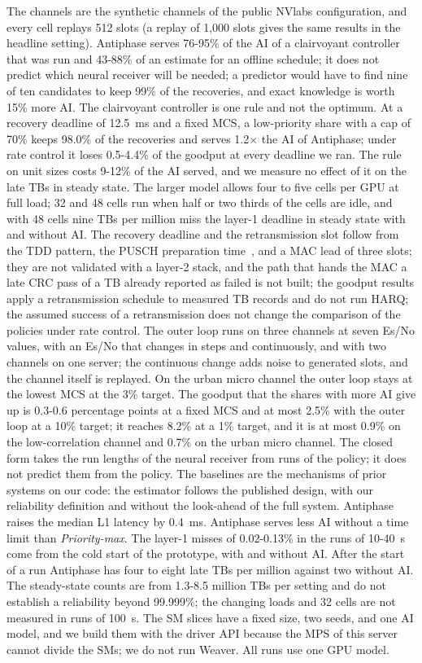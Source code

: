 \documentclass[acmsmall,screen,review,anonymous]{acmart}
\newcommand{\sys}{Antiphase\xspace}
\begin{document}
The channels are the synthetic channels of the public NVlabs configuration, and every cell replays 512
slots (a replay of 1,000 slots gives the same results in the headline setting). \sys serves 76-95\% of the AI of a
clairvoyant controller that was run and 43-88\% of an estimate for an offline schedule; it does not predict
which neural receiver will be needed; a predictor would have to find nine of ten candidates to keep 99\%
of the recoveries, and exact knowledge is worth 15\% more AI. The clairvoyant controller is one rule and not the optimum. At a recovery
deadline of 12.5~ms and a fixed MCS, a low-priority share with a cap of 70\% keeps 98.0\% of the recoveries and serves
1.2$\times$ the AI of \sys; under rate control it loses 0.5-4.4\% of the goodput at every deadline we ran. The
rule on unit sizes costs 9-12\% of the AI served, and we measure no effect of it on the late TBs in steady state. The larger model allows four to five cells per GPU at full load; 32 and 48 cells run when half or
two thirds of the cells are idle, and with 48 cells nine TBs per million miss the layer-1 deadline in steady
state with and without AI. The recovery deadline and the retransmission slot follow from the TDD pattern, the PUSCH preparation
time~\cite{ts38214}, and a MAC lead of three slots; they are not validated with a layer-2 stack, and the path
that hands the MAC a late CRC pass of a TB already reported as failed is not built; the goodput results apply a retransmission
schedule to measured TB records and do not run HARQ; the assumed success of a retransmission does not change the
comparison of the policies under rate control. The outer loop runs on three channels at seven Es/No values,
with an Es/No that changes in steps and continuously, and with two channels on one server; the continuous
change adds noise to generated slots, and the channel itself is replayed. On the urban micro channel the outer
loop stays at the lowest MCS at the 3\% target. The goodput that the shares with more AI give up is
0.3-0.6 percentage points at a fixed MCS and at most 2.5\% with the outer loop at a 10\% target; it reaches
8.2\% at a 1\% target, and it is at most 0.9\% on the low-correlation channel and 0.7\% on the urban micro channel. The closed form takes the run lengths of the neural receiver from
runs of the policy; it does not predict them from the policy. The baselines are the mechanisms of prior
systems on our code: the estimator follows the published design, with our reliability definition and
without the look-ahead of the full system. \sys raises the median L1 latency by 0.4~ms. \sys serves less
AI without a time limit than \textit{Priority-max}. The layer-1 misses of 0.02-0.13\% in the runs of 10-40~s
come from the cold start of the prototype, with and without AI. After the start of a run \sys has four to eight late TBs per million against two without AI. The steady-state counts are from 1.3-8.5
million TBs per setting and do not establish a reliability beyond 99.999\%; the changing loads and 32 cells
are not measured in runs of 100~s. The SM slices have a fixed size, two seeds, and one AI model, and we
build them with the driver API because the MPS of this server cannot divide the SMs; we do not run Weaver.
All runs use one GPU model.
\end{document}
